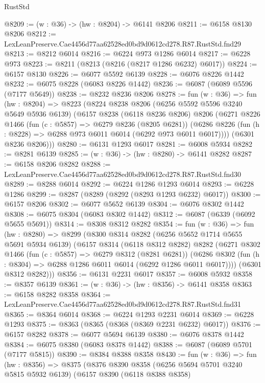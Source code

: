 \begin{lexlean}{RustStd}
\begin{coremodule}
{{@8209 := (w : @36) -> (hw : @8204) -> @6141 @8206
@8211 := @6158 @8130 @8206
@8212 := LexLeanPreserve.Cae4456d77aa62528ed0bd9d0612cd278.R87.RustStd.fnd29
@8213 := @8212 @6014
@8216 := @6224 @973 @1286 @6014
@8217 := @6228 @973
@8223 := @8211 (@8213 (@8216 (@8217 @1286 @6232) @6017))
@8224 := @6157 @8130
@8226 := @6077 @5592 @6139
@8228 := @6076 @8226 @1442
@8232 := @6075 @8228 (@6083 @8226 @1442)
@8236 := @6087 (@6089 @5596 (@7177 @5649))
@8238 := @8232 @8236 @8206
@8278 := fun (w : @36) =>
  fun (hw : @8204) =>
  @8223
    (@8224
      @8238
      @8206
      (@6256 @5592 @5596 @3240 @5649 @5936 @6139)
      (@6157
        @8238
        (@6118 @8236 @8206)
        @8206
        (@6271
          @8226
          @1466
          (fun (c : @5857) => @6279 @8236 (@8205 @6281))
          (@6286 @8226 (fun (h : @8228) => @6288 @973 @6011 @6014 (@6292 @973 @6011 @6017))))
        (@6301 @8236 @8206)))
@8280 := @6131 @1293 @6017
@8281 := @6008 @5934
@8282 := @8281 @6139
@8285 := (w : @36) -> (hw : @8280) -> @6141 @8282
@8287 := @6158 @8206 @8282
@8288 := LexLeanPreserve.Cae4456d77aa62528ed0bd9d0612cd278.R87.RustStd.fnd30
@8289 := @8288 @6014
@8292 := @6224 @1286 @1293 @6014
@8293 := @6228 @1286
@8299 := @8287 (@8289 (@8292 (@8293 @1293 @6232) @6017))
@8300 := @6157 @8206
@8302 := @6077 @5652 @6139
@8304 := @6076 @8302 @1442
@8308 := @6075 @8304 (@6083 @8302 @1442)
@8312 := @6087 (@6339 (@6092 @5655 @5691))
@8314 := @8308 @8312 @8282
@8354 := fun (w : @36) =>
  fun (hw : @8280) =>
  @8299
    (@8300
      @8314
      @8282
      (@6256 @5652 @1714 @5655 @5691 @5934 @6139)
      (@6157
        @8314
        (@6118 @8312 @8282)
        @8282
        (@6271
          @8302
          @1466
          (fun (c : @5857) => @6279 @8312 (@8281 @6281))
          (@6286 @8302 (fun (h : @8304) => @6288 @1286 @6011 @6014 (@6292 @1286 @6011 @6017))))
        (@6301 @8312 @8282)))
@8356 := @6131 @2231 @6017
@8357 := @6008 @5932
@8358 := @8357 @6139
@8361 := (w : @36) -> (hw : @8356) -> @6141 @8358
@8363 := @6158 @8282 @8358
@8364 := LexLeanPreserve.Cae4456d77aa62528ed0bd9d0612cd278.R87.RustStd.fnd31
@8365 := @8364 @6014
@8368 := @6224 @1293 @2231 @6014
@8369 := @6228 @1293
@8375 := @8363 (@8365 (@8368 (@8369 @2231 @6232) @6017))
@8376 := @6157 @8282
@8378 := @6077 @5694 @6139
@8380 := @6076 @8378 @1442
@8384 := @6075 @8380 (@6083 @8378 @1442)
@8388 := @6087 (@6089 @5701 (@7177 @5815))
@8390 := @8384 @8388 @8358
@8430 := fun (w : @36) =>
  fun (hw : @8356) =>
  @8375
    (@8376
      @8390
      @8358
      (@6256 @5694 @5701 @3240 @5815 @5932 @6139)
      (@6157
        @8390
        (@6118 @8388 @8358)
}}
\end{coremodule}
\end{lexlean}
